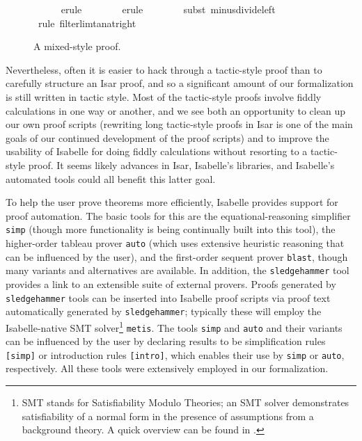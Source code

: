 \documentclass[leqno]{article}
\theoremstyle{definition}
\begin{document}
\begin{figure}
\begin{isabellebody}
\ \ \ \ \isamarkupfalse%
\ {\isacharparenleft}erule\ {\isacharparenleft}{}{\isacharparenright}\ {}{\isacharparenright}\isanewline
\ \ \ \ \isamarkupfalse%
\ {\isacharparenleft}erule\ {\isacharparenleft}{}{\isacharparenright}\ {}{\isacharparenright}\isanewline
\ \ \ \ \isamarkupfalse%
\ {\isacharparenleft}subst\ minus{\isacharunderscore}divide{\isacharunderscore}left{\isacharparenright}{\isacharplus}\isanewline
\ \ \ \ \isamarkupfalse%
\ {\isacharparenleft}rule\ filterlim{\isacharunderscore}tan{\isacharunderscore}at{\isacharunderscore}right{\isacharparenright}\isanewline
{}\isamarkupfalse%
\end{isabellebody}
\caption{A mixed-style proof.}
\label{fig:mix}
\end{figure}

Nevertheless, often it is easier to hack through a tactic-style proof than to carefully structure an Isar proof, and so a significant amount of our formalization is still written in tactic style. Most of the tactic-style proofs involve fiddly calculations in one way or another, and we see both an opportunity to clean up our own proof scripts (rewriting long tactic-style proofs in Isar is one of the main goals of our continued development of the proof scripts) and to improve the usability of Isabelle for doing fiddly calculations without resorting to a tactic-style proof. It seems likely advances in Isar, Isabelle's libraries, and Isabelle's automated tools could all benefit this latter goal.

To help the user prove theorems more efficiently, Isabelle provides support for proof automation. The basic tools for this are the equational-reasoning simplifier \texttt{simp} (though more functionality is being continually built into this tool), the higher-order tableau prover \texttt{auto} (which uses extensive heuristic reasoning that can be influenced by the user), and the first-order sequent prover \texttt{blast}, though many variants and alternatives are available. In addition, the \texttt{sledgehammer} tool \cite{paulson-sledgehammer} provides a link to an extensible suite of external provers. Proofs generated by \texttt{sledgehammer} tools can be inserted into Isabelle proof scripts via proof text automatically generated by \texttt{sledgehammer}; typically these will employ the Isabelle-native SMT solver\footnote{SMT stands for Satisfiability Modulo Theories; an SMT solver demonstrates satisfiability of a normal form in the presence of assumptions from a background theory. A quick overview can be found in \cite{demoura-bjorner-smt}.} \texttt{metis}. The tools \texttt{simp} and \texttt{auto} and their variants can be influenced by the user by declaring results to be simplification rules \texttt{[simp]} or introduction rules \texttt{[intro]}, which enables their use by \texttt{simp} or \texttt{auto}, respectively. All these tools were extensively employed in our formalization.
\end{document}
